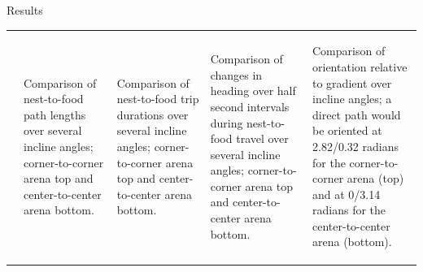 \begin{block}{Results}
\begin{centering}
\begin{tabular}{p{} *{4}{|p{0.145\textwidth}}}
\begin{spacing}{1.0}
\end{spacing}
& 
\begin{spacing}{1.0}
\footnotesize{
Comparison of nest-to-food path lengths over several incline angles; corner-to-corner arena top and center-to-center arena bottom.
}
\end{spacing}
&
\begin{spacing}{1.0}
\footnotesize{
Comparison of nest-to-food trip durations over several incline angles; corner-to-corner arena top and center-to-center arena bottom.}
\end{spacing}
&
\begin{spacing}{1.0}
\footnotesize{
Comparison of changes in heading over half second intervals during nest-to-food travel over several incline angles; corner-to-corner arena top and center-to-center arena bottom.
}
\end{spacing}
& 
\begin{spacing}{1.0}
\footnotesize{
Comparison of orientation relative to gradient over incline angles; a direct path would be oriented at 2.82/0.32 radians for the corner-to-corner arena (top) and at 0/3.14 radians for the center-to-center arena (bottom).}
\end{spacing}
\end{tabular}
\end{centering}
\end{block}   
